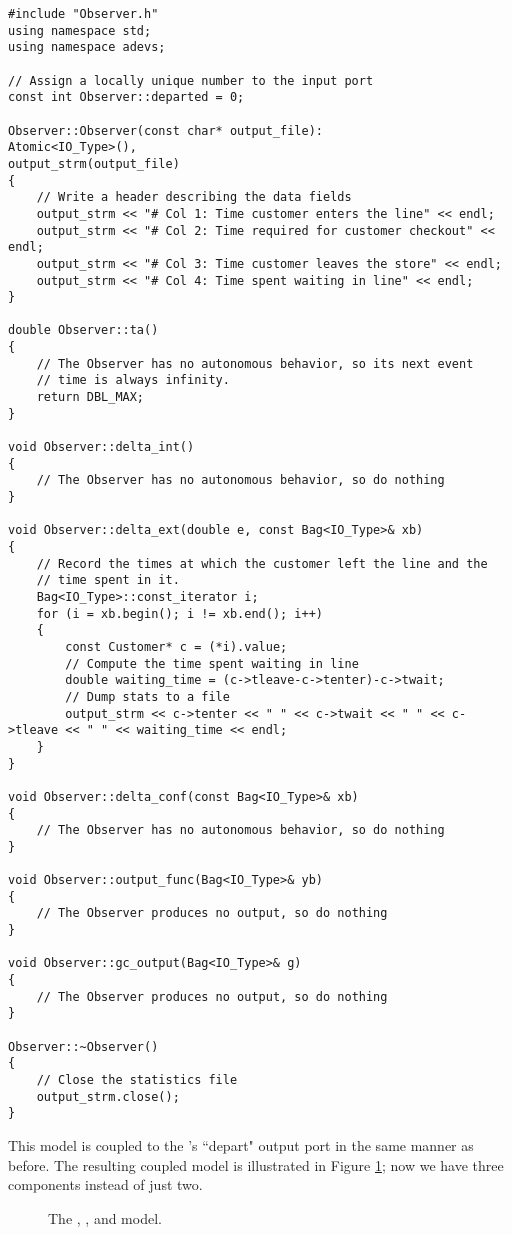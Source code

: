 \begin{verbatim}
#include "Observer.h"
using namespace std;
using namespace adevs;

// Assign a locally unique number to the input port
const int Observer::departed = 0;

Observer::Observer(const char* output_file):
Atomic<IO_Type>(),
output_strm(output_file)
{
    // Write a header describing the data fields
    output_strm << "# Col 1: Time customer enters the line" << endl;
    output_strm << "# Col 2: Time required for customer checkout" << endl;
    output_strm << "# Col 3: Time customer leaves the store" << endl;
    output_strm << "# Col 4: Time spent waiting in line" << endl;
}

double Observer::ta()
{
    // The Observer has no autonomous behavior, so its next event
    // time is always infinity.
    return DBL_MAX;
}

void Observer::delta_int()
{
    // The Observer has no autonomous behavior, so do nothing
}

void Observer::delta_ext(double e, const Bag<IO_Type>& xb)
{
    // Record the times at which the customer left the line and the
    // time spent in it.
    Bag<IO_Type>::const_iterator i;
    for (i = xb.begin(); i != xb.end(); i++)
    {
        const Customer* c = (*i).value;
        // Compute the time spent waiting in line 
        double waiting_time = (c->tleave-c->tenter)-c->twait;
        // Dump stats to a file
        output_strm << c->tenter << " " << c->twait << " " << c->tleave << " " << waiting_time << endl;
    }
}

void Observer::delta_conf(const Bag<IO_Type>& xb)
{
    // The Observer has no autonomous behavior, so do nothing
}

void Observer::output_func(Bag<IO_Type>& yb)
{
    // The Observer produces no output, so do nothing
}

void Observer::gc_output(Bag<IO_Type>& g)
{
    // The Observer produces no output, so do nothing
}

Observer::~Observer()
{
    // Close the statistics file
    output_strm.close();
}
\end{verbatim}

This model is coupled to the 's ``depart" output port in the same manner as before. The resulting coupled model is illustrated in Figure \ref{fig:complete_store_model};
now we have three components instead of just two.
\begin{figure}[ht]
\centering
{}
\caption{The , , and  model.} 
\label{fig:complete_store_model}
\end{figure}

